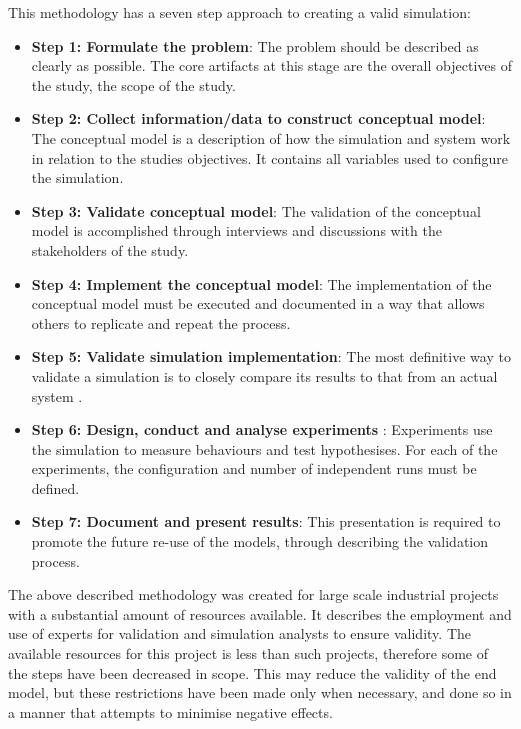 This methodology has a seven step approach to creating a valid simulation:
\begin{itemize}
  \item \textbf{Step 1: Formulate the problem}: %
	The problem should be described as clearly as possible.
	The core artifacts at this stage are the overall objectives of the study, the scope of the study.
\item \textbf{Step 2: Collect information/data to construct conceptual model}: %
	The conceptual model is a description of how the simulation and system work in relation to the studies objectives.
	It contains all variables used to configure the simulation. 
\item \textbf{Step 3: Validate conceptual model}: %
	The validation of the conceptual model is accomplished through interviews and discussions with the stakeholders of the study.
\item \textbf {Step 4: Implement the conceptual model}: %
	The implementation of the conceptual model must be executed and documented in a way that allows others to replicate and repeat the process.
\item \textbf{Step 5: Validate simulation implementation}: %
	The most definitive way to validate a simulation is to closely compare its results to that from an actual system \citep{Law2005}.
\item \textbf{Step 6: Design, conduct and analyse experiments} :
	Experiments use the simulation to measure behaviours and test hypothesises. 
	For each of the experiments, the configuration and number of independent runs must be defined.
\item \textbf{Step 7: Document and present results}:
	This presentation is required to promote the future re-use of the models, through describing the validation process.
\end{itemize}

The above described methodology was created for large scale industrial projects with a substantial amount of resources available.
It describes the employment and use of experts for validation and simulation analysts to ensure validity.
The available resources for this project is less than such projects, therefore some of the steps have been decreased in scope.
This may reduce the validity of the end model, but these restrictions have been made only when necessary,
and done so in a manner that attempts to minimise negative effects.

